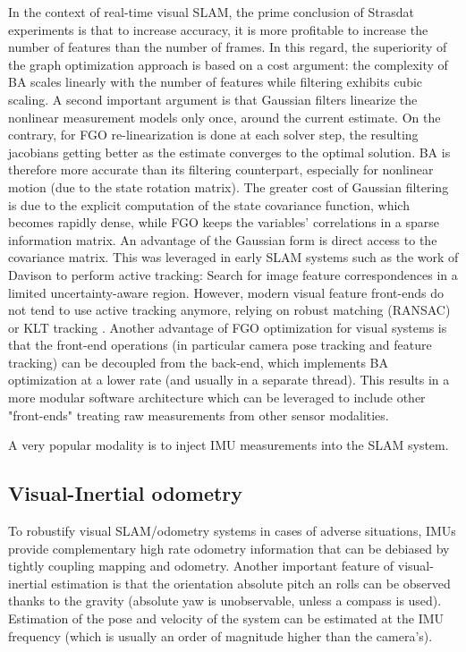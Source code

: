 In the context of real-time visual SLAM, the prime conclusion of Strasdat experiments \cite{strasdat2012visual} is that to increase accuracy, it is more
profitable to increase the number of features than the number of frames. In this regard, the superiority of the graph optimization approach is 
based on a cost argument: the complexity of BA scales linearly with the number of features while filtering exhibits cubic scaling. A second important argument 
is that Gaussian filters linearize the nonlinear measurement models only once, around the current estimate. On the contrary, 
for FGO re-linearization is done at each solver step, the resulting jacobians getting better as the estimate converges
to the optimal solution. BA is therefore more accurate than its filtering counterpart, especially for nonlinear motion (due to the state rotation matrix).
The greater cost of Gaussian filtering is due to the explicit computation of the state covariance function, which becomes rapidly dense,
while FGO keeps the variables' correlations in a sparse information matrix. An advantage of the Gaussian form is direct access to the 
covariance matrix. This was leveraged in early SLAM systems such as the work of Davison \cite{davison2007monoslam} to perform active tracking: 
Search for image feature correspondences in a limited uncertainty-aware region. However, modern visual feature front-ends do not tend to
use active tracking anymore, relying on robust matching (RANSAC) \cite{mur2015orb} or KLT tracking \cite{baker2004lucas, ferrera2021ov}. Another advantage of 
FGO optimization for visual systems is that the front-end operations (in particular camera pose tracking and feature tracking) can be decoupled
from the back-end, which implements BA optimization at a lower rate (and usually in a separate thread). This results in a more modular software 
architecture which can be leveraged to include other "front-ends" treating raw measurements from other sensor modalities. 

A very popular modality is to inject IMU measurements into the SLAM system.


\subsection{Visual-Inertial odometry}
To robustify visual SLAM/odometry systems in cases of adverse situations, IMUs provide complementary high rate odometry information that can 
be debiased by tightly coupling mapping and odometry. Another important feature of visual-inertial estimation is that the orientation absolute 
pitch an rolls can be observed thanks to the gravity (absolute yaw is unobservable, unless a compass is used). Estimation of the pose and velocity
of the system can be estimated at the IMU frequency (which is usually an order of magnitude higher than the camera's).

